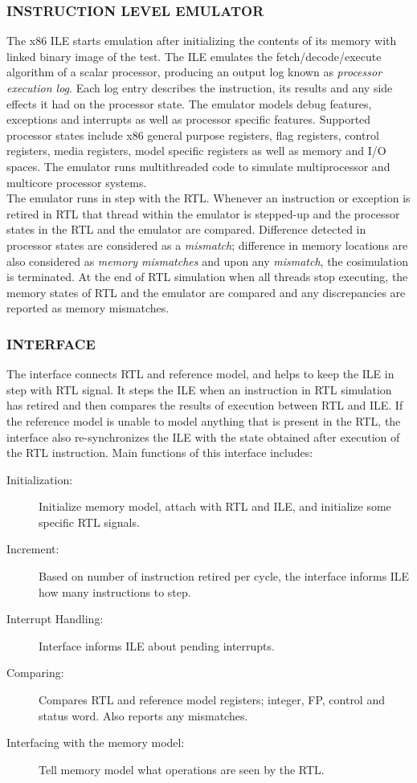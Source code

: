 \subsubsection {INSTRUCTION LEVEL EMULATOR}
The x86 ILE starts emulation after initializing the contents of its memory with linked binary image of the test. The ILE emulates the fetch/decode/execute algorithm of a scalar processor, producing an output log known as {\it processor execution log}. Each log entry describes the instruction, its results and any side effects it had on the processor state. The emulator models debug features, exceptions and interrupts as well as processor specific features. Supported processor states include x86 general purpose registers, flag registers, control registers, media registers, model specific registers as well as memory and I/O spaces. The emulator runs multithreaded code to simulate multiprocessor and multicore processor systems.\\ 
The emulator runs in step with the RTL. Whenever an instruction or exception is retired in RTL that thread within the emulator is stepped-up and the processor states in the RTL and the emulator are compared. Difference detected in processor states are considered as a {\it mismatch}; difference in memory locations are also considered as {\it memory mismatches} and upon any {\it mismatch}, the cosimulation is terminated. At the end of RTL simulation when all threads stop executing, the memory states of RTL and the emulator are compared and any discrepancies are reported as memory mismatches.

\subsubsection {INTERFACE}
The interface connects RTL and reference model, and helps to keep the ILE in step with RTL signal. It steps the ILE when an instruction in RTL simulation has retired and then compares the results of execution between RTL and ILE. If the reference model is unable to model anything that is present in the RTL, the interface also re-synchronizes the ILE with the state obtained after execution of the RTL instruction.
Main functions of this interface includes:
\begin{description}
	\item[Initialization:] Initialize memory model, attach with RTL and ILE, and initialize some specific RTL signals.
	\item[Increment:] Based on number of instruction retired per cycle, the interface informs ILE how many instructions to step.
	\item[Interrupt Handling:] Interface informs ILE about pending interrupts.
	\item[Comparing:] Compares RTL and reference model registers; integer, FP, control and status word. Also reports any mismatches.
	\item[Interfacing with the memory model:] Tell memory model what operations are seen by the RTL. 
\end{description}

